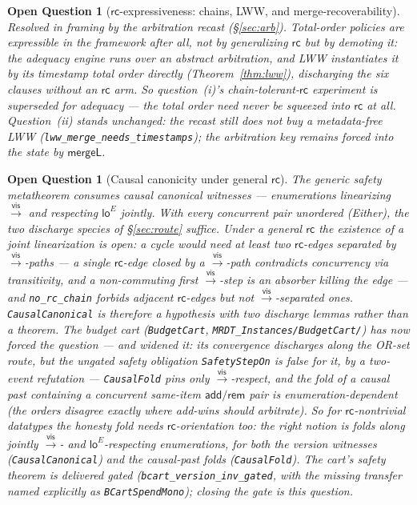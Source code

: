 \documentclass[11pt]{article}
\newtheorem{openq}[theorem]{Open Question}
\newcommand{\vis}{\xrightarrow{\mathsf{vis}}}
\newcommand{\rcrel}{\mathsf{rc}}                 %
\newcommand{\mergeL}{\mathsf{mergeL}}
\newcommand{\loE}[1]{\mathsf{lo}^{#1}}
\newcommand{\lean}[1]{\texttt{#1}}
\begin{document}
\begin{openq}[$\rcrel$-expressiveness: chains, LWW, and
merge-recoverability]
\emph{Resolved in framing by the arbitration recast (\S\ref{sec:arb}).}
Total-order policies are expressible in the framework after all, not by
generalizing $\rcrel$ but by demoting it: the adequacy engine runs over an
abstract arbitration, and LWW instantiates it by its timestamp total order
directly (Theorem~\ref{thm:lww}), discharging the six clauses without an
$\rcrel$ arm. So question~(i)'s chain-tolerant-$\rcrel$ experiment is
superseded for adequacy --- the total order need never be squeezed into
$\rcrel$ at all. Question~(ii) stands unchanged: the recast still does not
buy a metadata-free LWW (\lean{lww\_merge\_needs\_timestamps}); the
arbitration key remains forced into the state by $\mergeL$.
\end{openq}

\begin{openq}[Causal canonicity under general $\rcrel$]
\label{oq:causalcanon}
The generic safety metatheorem consumes \emph{causal} canonical
witnesses --- enumerations linearizing $\vis$ and respecting $\loE{E}$
jointly. With every concurrent pair unordered (Either), the two discharge
species of \S\ref{sec:route} suffice. Under a general $\rcrel$ the
existence of a
joint linearization is open: a cycle would need at least two
$\rcrel$-edges separated by $\vis$-paths --- a single
$\rcrel$-edge closed by a $\vis$-path contradicts concurrency via
transitivity, and a non-commuting first $\vis$-step is an absorber
killing the edge --- and \lean{no\_rc\_chain} forbids adjacent
$\rcrel$-edges but not $\vis$-separated ones. \lean{CausalCanonical} is therefore a hypothesis with two discharge
lemmas rather than a theorem. The budget cart (\lean{BudgetCart},
\lean{MRDT\_Instances/BudgetCart/}) has now \emph{forced} the question ---
and widened it: its convergence discharges along the OR-set route, but the
ungated safety obligation \lean{SafetyStepOn} is \emph{false} for it, by a
two-event refutation --- \lean{CausalFold} pins only $\vis$-respect, and
the fold of a causal past containing a concurrent same-item
$\mathsf{add}/\mathsf{rem}$ pair is enumeration-dependent (the orders
disagree exactly where add-wins should arbitrate). So for
$\rcrel$-nontrivial datatypes the \emph{honesty fold} needs
$\rcrel$-orientation too: the right notion is folds along jointly
$\vis$- and $\loE{E}$-respecting enumerations, for both the version
witnesses (\lean{CausalCanonical}) and the causal-past folds
(\lean{CausalFold}). The cart's safety theorem is delivered gated
(\lean{bcart\_version\_inv\_gated}, with the missing transfer named
explicitly as \lean{BCartSpendMono}); closing the gate is this question.
\end{openq}
\end{document}
